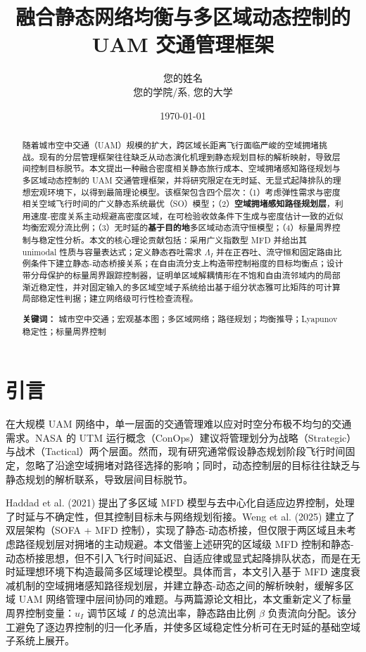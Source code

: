 \documentclass[a4paper,12pt]{article}
\title{\textbf{融合静态网络均衡与多区域动态控制的 UAM 交通管理框架}}
\author{您的姓名 \\ 您的学院/系, 您的大学}
\date{\today}
\theoremstyle{plain}
\theoremstyle{definition}
\theoremstyle{remark}
\begin{document}
\maketitle

\begin{abstract}
随着城市空中交通（UAM）规模的扩大，跨区域长距离飞行面临严峻的空域拥堵挑战。现有的分层管理框架往往缺乏从动态演化机理到静态规划目标的解析映射，导致层间控制目标脱节。本文提出一种融合密度相关静态旅行成本、空域拥堵感知路径规划与多区域动态控制的 UAM 交通管理框架，并将研究限定在无时延、无显式起降排队的理想宏观环境下，以得到最简理论模型。该框架包含四个层次：（1）考虑弹性需求与密度相关空域飞行时间的广义静态系统最优（SO）模型；（2）\textbf{空域拥堵感知路径规划层}，利用速度-密度关系主动规避高密度区域，在可检验收敛条件下生成与密度估计一致的近似均衡宏观分流比例；（3）无时延的\textbf{基于目的地}多区域动态流守恒模型；（4）标量周界控制与稳定性分析。本文的核心理论贡献包括：采用广义指数型 MFD 并给出其 unimodal 性质与容量表达式；定义静态吞吐需求 $\Lambda_I$ 并在正吞吐、流守恒和固定路由比例条件下建立静态-动态桥接关系；在自由流分支上构造带控制裕度的目标均衡点；设计带分母保护的标量周界跟踪控制器，证明单区域解耦情形在不饱和自由流邻域内的局部渐近稳定性，并对固定输入的多区域空域子系统给出基于组分状态雅可比矩阵的可计算局部稳定性判据；建立网络级可行性检查流程。

\textbf{关键词：} 城市空中交通；宏观基本图；多区域网络；路径规划；均衡推导；Lyapunov 稳定性；标量周界控制
\end{abstract}

\section{引言}
在大规模 UAM 网络中，单一层面的交通管理难以应对时空分布极不均匀的交通需求。NASA 的 UTM 运行概念（ConOps）建议将管理划分为战略（Strategic）与战术（Tactical）两个层面。然而，现有研究通常假设静态规划阶段飞行时间固定，忽略了沿途空域拥堵对路径选择的影响；同时，动态控制层的目标往往缺乏与静态规划的解析联系，导致层间目标脱节。

Haddad et al. (2021) 提出了多区域 MFD 模型与去中心化自适应边界控制，处理了时延与不确定性，但其控制目标未与网络规划衔接。Weng et al. (2025) 建立了双层架构（SOFA + MFD 控制），实现了静态-动态桥接，但仅限于两区域且未考虑路径规划层对拥堵的主动规避。本文借鉴上述研究的区域级 MFD 控制和静态-动态桥接思想，但不引入飞行时间延迟、自适应律或显式起降排队状态，而是在无时延理想环境下构造最简多区域理论模型。具体而言，本文引入基于 MFD 速度衰减机制的空域拥堵感知路径规划层，并建立静态-动态之间的解析映射，缓解多区域 UAM 网络管理中层间协同的难题。与两篇源论文相比，本文重新定义了标量周界控制变量：$u_I$ 调节区域 $I$ 的总流出率，静态路由比例 $\beta$ 负责流向分配。该分工避免了逐边界控制的归一化矛盾，并使多区域稳定性分析可在无时延的基础空域子系统上展开。
\end{document}
